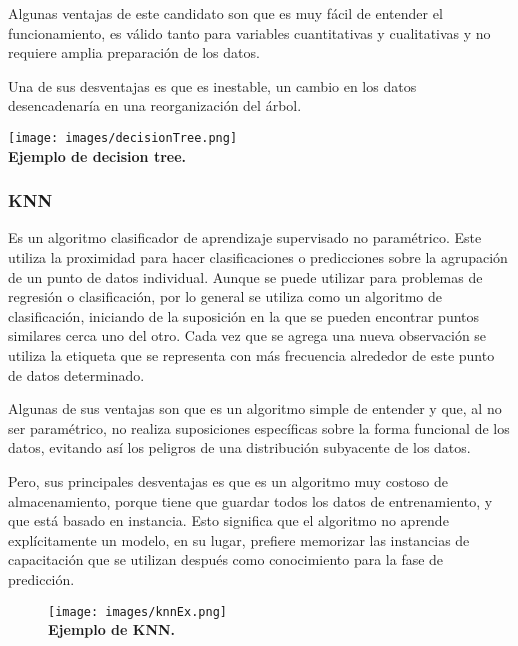 \documentclass{article}
\begin{document}
            Algunas ventajas de este candidato son que es muy fácil de entender el funcionamiento, es válido tanto para variables cuantitativas y cualitativas y no requiere amplia preparación de los datos.

            Una de sus desventajas es que es inestable, un cambio en los datos desencadenaría en una reorganización del árbol.

            \texttt{[image: images/decisionTree.png]} \\

            \textbf{Ejemplo de decision tree.}
            

        \subsubsection{KNN}

            Es un algoritmo clasificador de aprendizaje supervisado no paramétrico. Este utiliza la proximidad para hacer clasificaciones o predicciones sobre la agrupación de un punto de datos individual. Aunque se puede utilizar para problemas de regresión o clasificación, por lo general se utiliza como un algoritmo de clasificación, iniciando de la suposición en la que se pueden encontrar puntos similares cerca uno del otro. Cada vez que se agrega una nueva observación se utiliza la etiqueta que se representa con más frecuencia alrededor de este punto de datos determinado.

            Algunas de sus ventajas son que es un algoritmo simple de entender y que, al no ser paramétrico, no realiza suposiciones específicas sobre la forma funcional de los datos, evitando así los peligros de una distribución subyacente de los datos.

            Pero, sus principales desventajas es que es un algoritmo muy costoso de almacenamiento, porque tiene que guardar todos los datos de entrenamiento, y que está basado en instancia. Esto significa que el algoritmo no aprende explícitamente un modelo, en su lugar, prefiere memorizar las instancias de capacitación que se utilizan después como conocimiento para la fase de predicción.

            \begin{figure}[ht]
            \centering
                \texttt{[image: images/knnEx.png]} \\
                \textbf{Ejemplo de KNN.} \\
            \end{figure}
\end{document}
